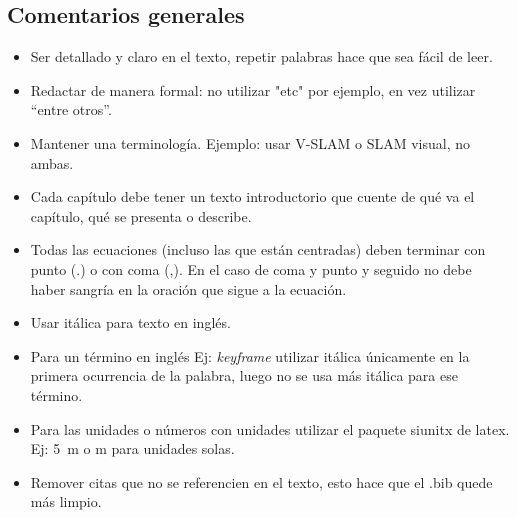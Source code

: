 \documentclass[a4paper,	11pt]{article}
\begin{document}
\subsection{Comentarios generales}
%
\begin{itemize}
    \item Ser detallado y claro en el texto, repetir palabras hace que sea fácil de leer.

    \item Redactar de manera formal: no utilizar "etc" por ejemplo, en vez utilizar ``entre otros''.

    \item Mantener una terminología. Ejemplo: usar V-SLAM o SLAM visual, no ambas.

    \item Cada capítulo debe tener un texto introductorio que cuente de qué va el capítulo, qué se presenta o describe.
    
    \item Todas las ecuaciones (incluso las que están centradas) deben terminar con punto (.) o con coma (,). En el caso de coma y punto y seguido no debe haber sangría en la oración que sigue a la ecuación.

    \item Usar itálica para texto en inglés.

    \item Para un término en inglés Ej: \emph{keyframe} utilizar itálica únicamente en la primera ocurrencia de la palabra, luego no se usa más itálica para ese término.

    \item Para las unidades o números con unidades utilizar el paquete siunitx de latex. Ej: \SI{5}{\meter} o \si{\meter} para unidades solas.

    \item Remover citas que no se referencien en el texto, esto hace que el .bib quede más limpio.
\end{itemize}
\end{document}
